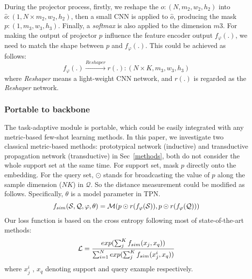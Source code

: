 \documentclass[a4paper]{article}
\begin{document}
During the projector process, firstly, we reshape the $o:(N, m_2, w_2, h_2)$ into $\hat{o}: (1, N \times m_2,w_2,h_2)$, then a small CNN is applied to $\hat{o}$, producing the mask $p: (1, m_3, w_3, h_3)$. Finally, a \textit{softmax} is also applied to the dimension $m3$.
For making the output of projector $p$ influence the feature encoder output $f_{\varphi}(.)$, we need to match the shape between $p$ and $f_{\varphi}(.)$. This could be achieved as follows: 
\begin{equation}
f_{\varphi}(.) \stackrel{Reshaper}{\longrightarrow} r(.): (N\times K, m_3, w_3, h_3)
\end{equation}
where \textit{Reshaper} means a light-weight CNN network, and $r(.)$ is regarded as the \textit{Reshaper} network. 

\subsubsection{Portable to backbone}
The task-adaptive module is portable, which could be easily integrated with any metric-based few-shot learning methods. In this paper, we investigate two classical metric-based methods: prototypical network (inductive) and transductive propagation network (transductive) in Sec~\ref{methods}, both do not consider the whole support set at the same time. 
For support set, mask $p$ directly onto the embedding. For the query set, $\odot$ stands for broadcasting the value of $p$ along the sample dimension ($NK$) in $\mathcal{Q}$. So the distance measurement could be modified as follows. Specifically, $\theta$ is a model parameter in TPN.
\vspace{-2mm}
\begin{equation}
\vspace{-1mm}
f_{sim}(\mathcal{S},\mathcal{Q},\varphi, \theta) = \mathcal{M}(p \odot  r(f_\varphi(\mathcal{S})), p \odot r(f_\varphi(\mathcal{Q})))
\vspace{-1mm}
\end{equation}
Our loss function is based on the cross entropy following most of state-of-the-art methods:
\vspace{-1mm}
\begin{equation}
\vspace{-1mm}
\mathcal{L} = \frac{exp(\sum_j^{K}f_{sim}(x_j,x_q))}{\sum_{i=1}^{N}exp(\sum_j^Kf_{sim}( x_j^i,x_q))}
\vspace{-1mm}
\end{equation}
where $x_j^i$ , $x_q$ denoting support and query example respectively.
\vspace{-4mm}
\end{document}
